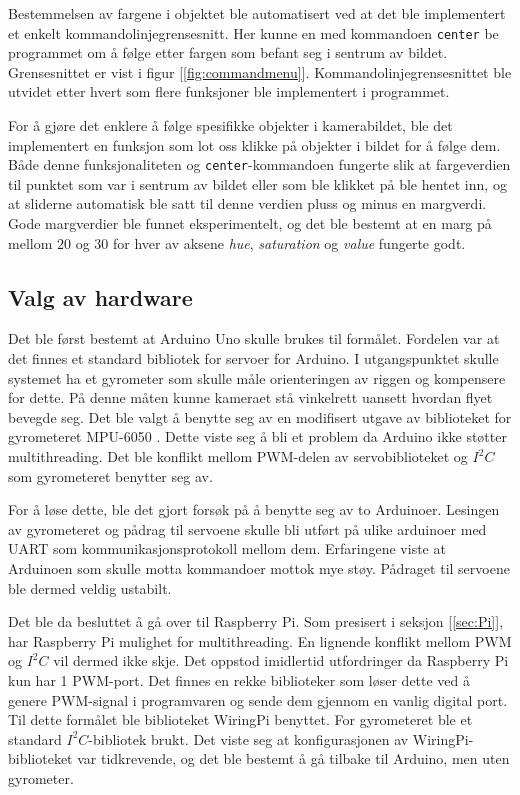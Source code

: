 Bestemmelsen av fargene i objektet ble automatisert ved at det ble implementert et enkelt kommandolinjegrensesnitt. Her kunne en med kommandoen \texttt{center} be programmet om å følge etter fargen som befant seg i sentrum av bildet. Grensesnittet er vist i figur [\ref{fig:commandmenu}]. Kommandolinjegrensesnittet ble utvidet etter hvert som flere funksjoner ble implementert i programmet.

For å gjøre det enklere å følge spesifikke objekter i kamerabildet, ble det implementert en funksjon som lot oss klikke på objekter i bildet for å følge dem. Både denne funksjonaliteten og \texttt{center}-kommandoen fungerte slik at fargeverdien til punktet som var i sentrum av bildet eller som ble klikket på ble hentet inn, og at sliderne automatisk ble satt til denne verdien pluss og minus en margverdi. Gode margverdier ble funnet eksperimentelt, og det ble bestemt at en marg på mellom $20$ og $30$ for hver av aksene \emph{hue}, \emph{saturation} og \emph{value} fungerte godt.

\subsection{Valg av hardware}

Det ble først bestemt at Arduino Uno skulle brukes til formålet. Fordelen var at det finnes et standard bibliotek for servoer for Arduino. I utgangspunktet skulle systemet ha et gyrometer som skulle måle orienteringen av riggen og kompensere for dette. På denne måten kunne kameraet stå vinkelrett uansett hvordan flyet bevegde seg. Det ble valgt å benytte seg av en modifisert utgave av biblioteket for gyrometeret MPU-6050 \cite{GyroLib}. Dette viste seg å bli et problem da Arduino ikke støtter multithreading. Det ble konflikt mellom PWM-delen av servobiblioteket og $I^2C$ \cite{i2c} som gyrometeret benytter seg av.

For å løse dette, ble det gjort forsøk på å benytte seg av to Arduinoer. Lesingen av gyrometeret og pådrag til servoene skulle bli utført på ulike arduinoer med UART som kommunikasjonsprotokoll mellom dem. Erfaringene viste at Arduinoen som skulle motta kommandoer mottok mye støy. Pådraget til servoene ble dermed veldig ustabilt.

Det ble da besluttet å gå over til Raspberry Pi. Som presisert i seksjon [\ref{sec:Pi}], har Raspberry Pi mulighet for multithreading. En lignende konflikt mellom PWM og $I^2C$ vil dermed ikke skje. Det oppstod imidlertid utfordringer da Raspberry Pi kun har 1 PWM-port. Det finnes en rekke biblioteker som løser dette ved å genere PWM-signal i programvaren og sende dem gjennom en vanlig digital port. Til dette formålet ble biblioteket WiringPi \cite{WirPi} benyttet. For gyrometeret ble et standard $I^2C$-bibliotek brukt. Det viste seg at konfigurasjonen av WiringPi-biblioteket var tidkrevende, og det ble bestemt å gå tilbake til Arduino, men uten gyrometer.

